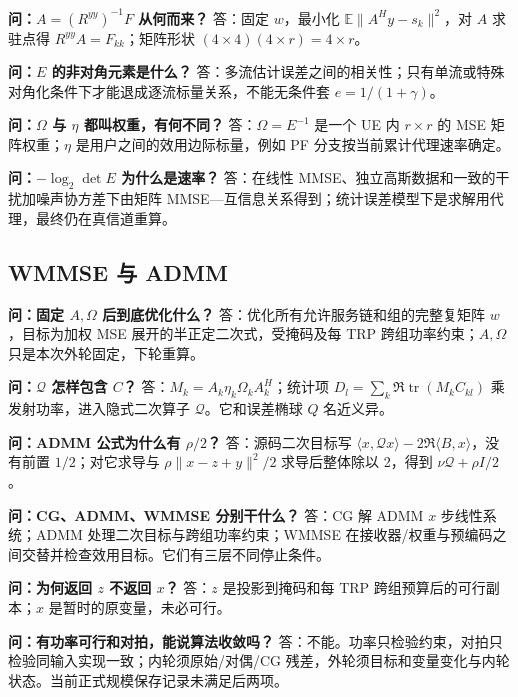 \documentclass[11pt,a4paper]{ctexart}
\begin{document}
\textbf{问：$A=(R^{yy})^{-1}F$ 从何而来？} 答：固定 $w$，最小化 $\mathbb E\|A^Hy-s_k\|^2$，对 $A$ 求驻点得 $R^{yy}A=F_{kk}$；矩阵形状 $(4\times4)(4\times r)=4\times r$。\par

\textbf{问：$E$ 的非对角元素是什么？} 答：多流估计误差之间的相关性；只有单流或特殊对角化条件下才能退成逐流标量关系，不能无条件套 $e=1/(1+\gamma)$。\par

\textbf{问：$\Omega$ 与 $\eta$ 都叫权重，有何不同？} 答：$\Omega=E^{-1}$ 是一个 UE 内 $r\times r$ 的 MSE 矩阵权重；$\eta$ 是用户之间的效用边际标量，例如 PF 分支按当前累计代理速率确定。\par

\textbf{问：$-\log_2\det E$ 为什么是速率？} 答：在线性 MMSE、独立高斯数据和一致的干扰加噪声协方差下由矩阵 MMSE—互信息关系得到；统计误差模型下是求解用代理，最终仍在真信道重算。\par

\subsection*{WMMSE 与 ADMM}

\textbf{问：固定 $A,\Omega$ 后到底优化什么？} 答：优化所有允许服务链和组的完整复矩阵 $w$，目标为加权 MSE 展开的半正定二次式，受掩码及每 TRP 跨组功率约束；$A,\Omega$ 只是本次外轮固定，下轮重算。\par

\textbf{问：$\mathcal Q$ 怎样包含 $C$？} 答：$M_k=A_k\eta_k\Omega_kA_k^H$；统计项 $D_l=\sum_k\Re\operatorname{tr}(M_kC_{kl})$ 乘发射功率，进入隐式二次算子 $\mathcal Q$。它和误差椭球 $Q$ 名近义异。\par

\textbf{问：ADMM 公式为什么有 $\rho/2$？} 答：源码二次目标写 $\langle x,\mathcal Qx\rangle-2\Re\langle B,x\rangle$，没有前置 $1/2$；对它求导与 $\rho\|x-z+y\|^2/2$ 求导后整体除以 2，得到 $\nu\mathcal Q+\rho I/2$。\par

\textbf{问：CG、ADMM、WMMSE 分别干什么？} 答：CG 解 ADMM $x$ 步线性系统；ADMM 处理二次目标与跨组功率约束；WMMSE 在接收器/权重与预编码之间交替并检查效用目标。它们有三层不同停止条件。\par

\textbf{问：为何返回 $z$ 不返回 $x$？} 答：$z$ 是投影到掩码和每 TRP 跨组预算后的可行副本；$x$ 是暂时的原变量，未必可行。\par

\textbf{问：有功率可行和对拍，能说算法收敛吗？} 答：不能。功率只检验约束，对拍只检验同输入实现一致；内轮须原始/对偶/CG 残差，外轮须目标和变量变化与内轮状态。当前正式规模保存记录未满足后两项。\par
\end{document}
